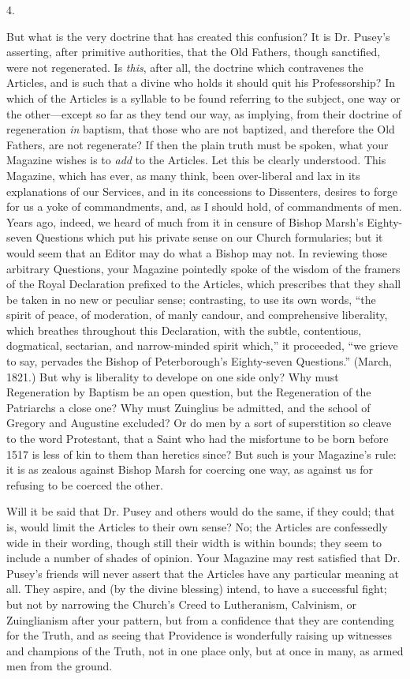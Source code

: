 4.

But what is the very doctrine that has created
this confusion? It is Dr. Pusey's asserting, after primitive
authorities, that the Old Fathers, though sanctified, were not
regenerated. Is \emph{this}, after all, the doctrine which contravenes
the Articles, and is such that a divine who holds it should quit his
Professorship? In which of the Articles is a syllable to be found
referring to the subject, one way or the other—except so far as they
tend our way, as implying, from their doctrine of regeneration \emph{in}
baptism, that those who are not baptized, and therefore the Old
Fathers, are not regenerate? If then the plain truth must be spoken,
what your Magazine wishes is to \emph{add} to the Articles. Let this
be clearly understood. This Magazine, which has ever, as many think,
been over-liberal and lax in its explanations of our Services, and in
its concessions to Dissenters, desires to forge for us a yoke of
commandments, and, as I should hold, of commandments of men.
Years ago, indeed, we heard of much from it in censure of Bishop Marsh's
Eighty-seven Questions which put his private sense on our Church
formularies; but it would seem that an Editor may do what a Bishop may
not. In reviewing those arbitrary Questions, your Magazine pointedly
spoke of the wisdom of the framers of the Royal Declaration prefixed
to the Articles, which prescribes that they shall be taken in no new
or peculiar sense; contrasting, to use its own words, ``the spirit of
peace, of moderation, of manly candour, and comprehensive liberality,
which breathes throughout this Declaration, with the subtle,
contentious, dogmatical, sectarian, and narrow-minded spirit which,''
it proceeded, ``we grieve to say, pervades the Bishop of Peterborough's
Eighty-seven Questions.'' (March, 1821.) But why is liberality to
develope on one side only? Why must Regeneration by Baptism be an open
question, but the Regeneration of the Patriarchs a close one? Why must
Zuinglius be admitted, and the school of Gregory and Augustine
excluded? Or do men by a sort of superstition so cleave to the word
Protestant, that a Saint who had the misfortune to be born before 1517
is less of kin to them than heretics since? But such is your Magazine's
rule: it is as zealous against Bishop Marsh for coercing one way, as
against us for refusing to be coerced the other.

Will it be said that Dr. Pusey and others would
do the same, if they could; that is, would limit the Articles to their
own sense? No; the Articles are confessedly wide in their wording,
though still their width is within bounds; they seem to include a
number of shades of opinion. Your Magazine may rest satisfied that Dr.
Pusey's friends will never assert that the Articles have any
particular meaning at all. They aspire, and (by the divine blessing)
intend, to have a successful fight; but not by narrowing the Church's Creed to Lutheranism, Calvinism, or Zuinglianism after your
pattern, but from a confidence that they are contending for the Truth,
and as seeing that Providence is wonderfully raising up witnesses and
champions of the Truth, not in one place only, but at once in many, as
armed men from the ground.

